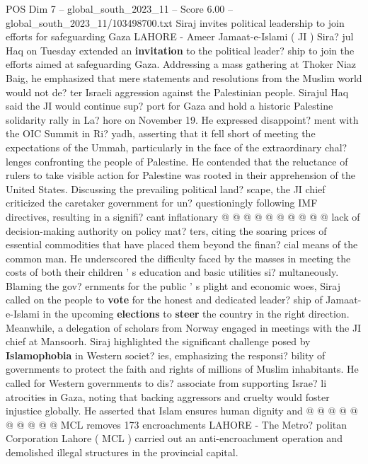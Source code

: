 \begin{textsample}{POS Dim 7 – global\_south\_2023\_11 – Score 6.00 – global\_south\_2023\_11/103498700.txt}  \label{ex:f7_pos_305}
Siraj invites political leadership to join efforts for safeguarding Gaza LAHORE - Ameer Jamaat-e-Islami ( JI ) Sira? jul Haq on Tuesday extended an \textbf{invitation} to the political leader? ship to join the efforts aimed at safeguarding Gaza.
Addressing a mass gathering at Thoker Niaz Baig, he emphasized that mere statements and resolutions from the Muslim world would not de? ter Israeli aggression against the Palestinian people.
Sirajul Haq said the JI would continue sup? port for Gaza and hold a historic Palestine solidarity rally in La? hore on November 19.
He expressed disappoint? ment with the OIC Summit in Ri? yadh, asserting that it fell short of meeting the expectations of the Ummah, particularly in the face of the extraordinary chal? lenges confronting the people of Palestine.
He contended that the reluctance of rulers to take visible action for Palestine was rooted in their apprehension of the United States.
Discussing the prevailing political land? scape, the JI chief criticized the caretaker government for un? questioningly following IMF directives, resulting in a signifi? cant inflationary @ @ @ @ @ @ @ @ @ @ lack of decision-making authority on policy mat? ters, citing the soaring prices of essential commodities that have placed them beyond the finan? cial means of the common man.
He underscored the difficulty faced by the masses in meeting the costs of both their children ' s education and basic utilities si? multaneously.
Blaming the gov? ernments for the public ' s plight and economic woes, Siraj called on the people to \textbf{vote} for the honest and dedicated leader? ship of Jamaat-e-Islami in the upcoming \textbf{elections} to \textbf{steer} the country in the right direction.
Meanwhile, a delegation of scholars from Norway engaged in meetings with the JI chief at Mansoorh.
Siraj highlighted the significant challenge posed by \textbf{Islamophobia} in Western societ? ies, emphasizing the responsi? bility of governments to protect the faith and rights of millions of Muslim inhabitants.
He called for Western governments to dis? associate from supporting Israe? li atrocities in Gaza, noting that backing aggressors and cruelty would foster injustice globally.
He asserted that Islam ensures human dignity and @ @ @ @ @ @ @ @ @ @ MCL removes 173 encroachments LAHORE - The Metro? politan Corporation Lahore ( MCL ) carried out an anti-encroachment operation and demolished illegal structures in the provincial capital.

\end{textsample}
